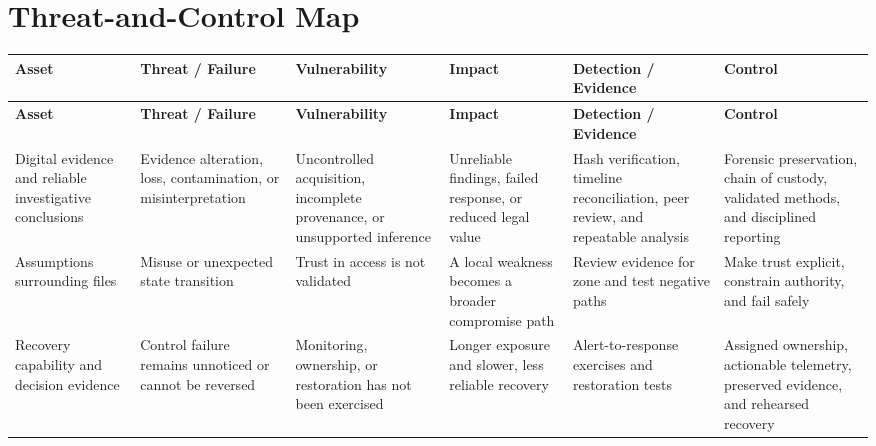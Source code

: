 \documentclass[11pt,letterpaper]{article}
\begin{document}
\section*{Threat-and-Control Map}
\begingroup\scriptsize\setlength{\tabcolsep}{2pt}
\begin{longtable}{>{\raggedright\arraybackslash}p{}>{\raggedright\arraybackslash}p{}>{\raggedright\arraybackslash}p{}>{\raggedright\arraybackslash}p{}>{\raggedright\arraybackslash}p{}>{\raggedright\arraybackslash}p{}}
\toprule\rowcolor{Navy}\color{white}\textbf{Asset} & \color{white}\textbf{Threat / Failure} & \color{white}\textbf{Vulnerability} & \color{white}\textbf{Impact} & \color{white}\textbf{Detection / Evidence} & \color{white}\textbf{Control}\\\midrule
\endfirsthead
\toprule\rowcolor{Navy}\color{white}\textbf{Asset} & \color{white}\textbf{Threat / Failure} & \color{white}\textbf{Vulnerability} & \color{white}\textbf{Impact} & \color{white}\textbf{Detection / Evidence} & \color{white}\textbf{Control}\\\midrule
\endhead
Digital evidence and reliable investigative conclusions & Evidence alteration, loss, contamination, or misinterpretation & Uncontrolled acquisition, incomplete provenance, or unsupported inference & Unreliable findings, failed response, or reduced legal value & Hash verification, timeline reconciliation, peer review, and repeatable analysis & Forensic preservation, chain of custody, validated methods, and disciplined reporting\\\midrule
Assumptions surrounding files & Misuse or unexpected state transition & Trust in access is not validated & A local weakness becomes a broader compromise path & Review evidence for zone and test negative paths & Make trust explicit, constrain authority, and fail safely\\\midrule
Recovery capability and decision evidence & Control failure remains unnoticed or cannot be reversed & Monitoring, ownership, or restoration has not been exercised & Longer exposure and slower, less reliable recovery & Alert-to-response exercises and restoration tests & Assigned ownership, actionable telemetry, preserved evidence, and rehearsed recovery\\\midrule
\bottomrule
\end{longtable}
\endgroup
\end{document}
